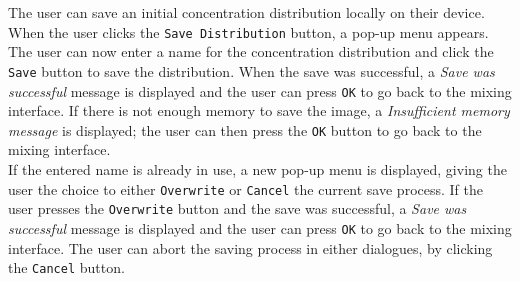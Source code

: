 The user can save an initial concentration distribution locally on their device. When the user clicks the \texttt{Save Distribution} button, a pop-up menu appears. The user can now enter a name for the concentration distribution and click the \texttt{Save} button to save the distribution. When the save was successful, a \emph{Save was successful} message is displayed and the user can press \texttt{OK} to go back to the mixing interface. If there is not enough memory to save the image, a \emph{Insufficient memory message} is displayed; the user can then press the \texttt{OK} button to go back to the mixing interface. \\
If the entered name is already in use, a new pop-up menu is displayed, giving the user the choice to either \texttt{Overwrite} or \texttt{Cancel} the current save process. If the user presses the \texttt{Overwrite} button and the save was successful, a \emph{Save was successful} message is displayed and the user can press \texttt{OK} to go back to the mixing interface. The user can abort the saving process in either dialogues, by clicking the \texttt{Cancel} button. \\


